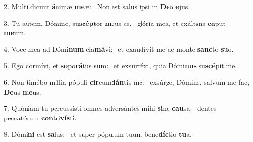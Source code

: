 2. Multi dicunt \textbf{á}nimæ \textbf{me}æ: \ast\  Non est salus ipsi in \textbf{De}o \textbf{e}jus.\

3. Tu autem, Dómine, su\textbf{scép}tor \textbf{me}us es, \ast\  glória mea, et exáltans \textbf{ca}put \textbf{me}um.\

4. Voce mea ad Dómi\textbf{num} cla\textbf{má}vi: \ast\  et exaudívit me de monte \textbf{sanc}to \textbf{su}o.\

5. Ego dormívi, et \textbf{so}po\textbf{rá}tus sum: \ast\  et exsurréxi, quia Dómi\textbf{nus} su\textbf{scé}pit me.\

6. Non timébo míllia pópuli \textbf{cir}cum\textbf{dán}tis me: \ast\  exsúrge, Dómine, salvum me fac, \textbf{De}us \textbf{me}us.\

7. Quóniam tu percussísti omnes adversántes mihi \textbf{si}ne \textbf{cau}sa: \ast\  dentes peccatórum \textbf{con}tri\textbf{vís}ti.\

8. Dómi\textbf{ni} est \textbf{sa}lus: \ast\  et super pópulum tuum bene\textbf{díc}tio \textbf{tu}a.\

